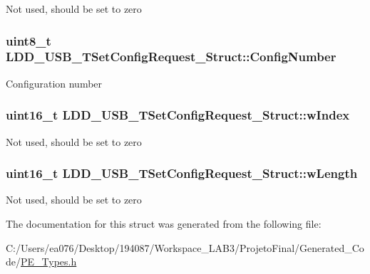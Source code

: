 Not used, should be set to zero \hypertarget{struct_l_d_d___u_s_b___t_set_config_request___struct_a9a545d7858a7ee85dbe37eaf2b4b7e01}{
\subsubsection[{Config\-Number}]{\setlength{\rightskip}{0pt plus 5cm}uint8\-\_\-t L\-D\-D\-\_\-\-U\-S\-B\-\_\-\-T\-Set\-Config\-Request\-\_\-\-Struct\-::\-Config\-Number}}\label{struct_l_d_d___u_s_b___t_set_config_request___struct_a9a545d7858a7ee85dbe37eaf2b4b7e01}
Configuration number \hypertarget{struct_l_d_d___u_s_b___t_set_config_request___struct_ad2aa2851b128777e842b2ac796d2f664}{
\subsubsection[{w\-Index}]{\setlength{\rightskip}{0pt plus 5cm}uint16\-\_\-t L\-D\-D\-\_\-\-U\-S\-B\-\_\-\-T\-Set\-Config\-Request\-\_\-\-Struct\-::w\-Index}}\label{struct_l_d_d___u_s_b___t_set_config_request___struct_ad2aa2851b128777e842b2ac796d2f664}
Not used, should be set to zero \hypertarget{struct_l_d_d___u_s_b___t_set_config_request___struct_a66312977eb5816459d0201a2bacaf9b5}{
\subsubsection[{w\-Length}]{\setlength{\rightskip}{0pt plus 5cm}uint16\-\_\-t L\-D\-D\-\_\-\-U\-S\-B\-\_\-\-T\-Set\-Config\-Request\-\_\-\-Struct\-::w\-Length}}\label{struct_l_d_d___u_s_b___t_set_config_request___struct_a66312977eb5816459d0201a2bacaf9b5}
Not used, should be set to zero 

The documentation for this struct was generated from the following file\-:\begin{DoxyCompactItemize}
\item 
C\-:/\-Users/ea076/\-Desktop/194087/\-Workspace\-\_\-\-L\-A\-B3/\-Projeto\-Final/\-Generated\-\_\-\-Code/\hyperlink{_p_e___types_8h}{P\-E\-\_\-\-Types.\-h}\end{DoxyCompactItemize}

